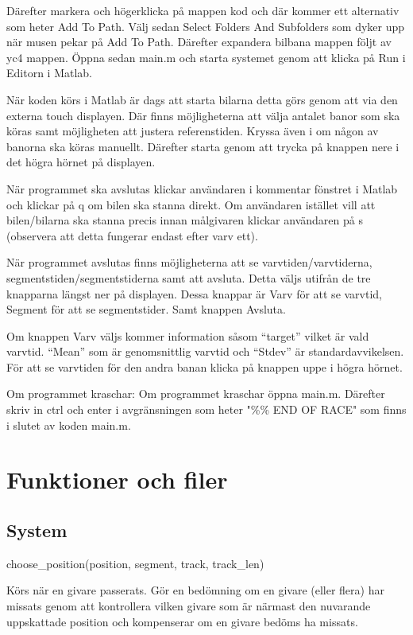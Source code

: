 \documentclass[10pt,oneside,swedish]{lips-no_customer}
\begin{document}
Därefter markera och högerklicka på mappen kod och där kommer ett alternativ som
heter Add To Path. Välj sedan Select Folders And Subfolders som dyker upp när
musen pekar på Add To Path. Därefter expandera bilbana mappen följt av yc4
mappen. Öppna sedan main.m och starta systemet genom att klicka på Run i Editorn
i Matlab.

När koden körs i Matlab är dags att starta bilarna detta görs genom att via den
externa touch displayen. Där finns möjligheterna att välja antalet banor som ska
köras samt möjligheten att justera referenstiden. Kryssa även i om någon av
banorna ska köras manuellt. Därefter starta genom att trycka på knappen nere i
det högra hörnet på displayen.

När programmet ska avslutas klickar användaren i kommentar fönstret i Matlab och
klickar på q om bilen ska stanna direkt. Om användaren istället vill att
bilen/bilarna ska stanna precis innan målgivaren klickar användaren på s
(observera att detta fungerar endast efter varv ett).

När programmet avslutas finns möjligheterna att se varvtiden/varvtiderna,
segmentstiden/segmentstiderna samt att avsluta. Detta väljs utifrån de tre
knapparna längst ner på displayen. Dessa knappar är Varv för att se varvtid,
Segment för att se segmentstider. Samt knappen Avsluta.

Om knappen Varv väljs kommer information såsom “target” vilket är vald varvtid.
“Mean” som är genomsnittlig varvtid och “Stdev” är standardavvikelsen. För att
se varvtiden för den andra banan klicka på knappen uppe i högra hörnet.

Om programmet kraschar: Om programmet kraschar öppna main.m. Därefter skriv in
ctrl och enter i avgränsningen som heter "\%\% END OF RACE" som finns i slutet av
koden main.m.

\section{Funktioner och filer}

\subsection{System}

choose\_position(position, segment, track, track\_len)

Körs när en givare passerats. Gör en bedömning om en givare (eller flera) har
missats genom att kontrollera vilken givare som är närmast den nuvarande
uppskattade position och kompenserar om en givare bedöms ha missats.
\end{document}
